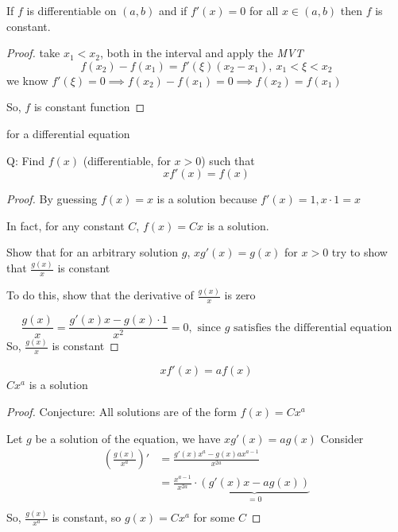 \begin{theorem*}
  If $f$ is differentiable on $(a, b)$ and if $f'(x) = 0$ for all $x\in(a, b)$ then $f$ is constant.
\end{theorem*}

\begin{proof}
  take $x_1 < x_2$, both in the interval and apply the \textit{MVT} 
  $$f(x_2) - f(x_1) = f'(\xi)(x_2-x_1),\ x_1 < \xi < x_2$$ 
  we know $f'(\xi) = 0 \implies f(x_2) - f(x_1) = 0 \implies f(x_2) = f(x_1)$

  So, $f$ is constant function
\end{proof}

\begin{example*}
  for a differential equation

  Q: Find $f(x)$ (differentiable, for $x > 0$) such that 
  $$x f'(x) = f(x)$$
\end{example*}

\begin{proof}
  By guessing $f(x) = x$ is a solution because $f'(x) = 1, x\cdot 1 = x$
  
  In fact, for any constant $C$, $f(x) = Cx$ is a solution.

  Show that for an arbitrary solution $g$, $xg'(x) = g(x)$ for $x > 0$
  try to show that $\frac{g(x)}{x}$ is constant

  To do this, show that the derivative of $\frac{g(x)}{x}$ is zero
  
  $$\frac{g(x)}{x} = \frac{g'(x)x-g(x)\cdot 1}{x^2} = 0,\text{ since } g \text{ satisfies the differential equation}$$
  So, $\frac{g(x)}{x}$ is constant
\end{proof}

\begin{example*}
  $$xf'(x)=af(x)$$
  $Cx^a$ is a solution
\end{example*}

\begin{proof}
  Conjecture: All solutions are of the form $f(x) = Cx^a$

  Let $g$ be a solution of the equation, we have $xg'(x) = ag(x)$
  Consider 
  \begin{align*}
    \left(\frac{g(x)}{x^a}\right)' &= \frac{g'(x)x^a-g(x)ax^{a-1}}{x^{2a}} \\
    &= \frac{x^{a-1}}{x^{2a}}\cdot \underbrace{(g'(x)x - ag(x))}_{=0}\\
  \end{align*}
  So, $\frac{g(x)}{x^a}$ is constant, so $g(x) = Cx^a$ for some $C$
\end{proof}

